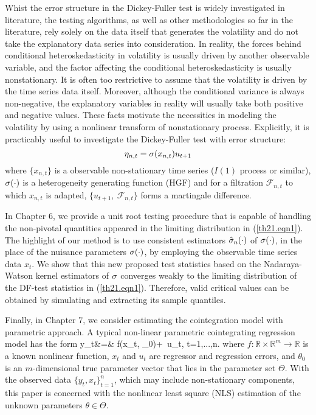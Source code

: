 Whist the error structure  in the Dickey-Fuller test is widely investigated in literature, the testing algorithms, as well as other methodologies so far in the literature,  rely solely on the  data itself that generates the volatility  and do not  take the explanatory data series into consideration. In reality, the forces behind conditional heteroskedasticity in volatility is usually driven by another observable variable, and the factor affecting the conditional heteroskedasticity is usually nonstationary. It is often too restrictive to assume that the volatility  is driven by the time series data itself. Moreover, although the conditional variance is always non-negative, the explanatory variables in reality will usually take both positive and negative values. These facts motivate the necessities in  modeling the volatility by using a nonlinear transform of nonstationary process. Explicitly, it is practicably useful to investigate  the Dickey-Fuller
 test with  error structure:
\begin{equation} \la{eqn11}
\eta_{n,t} = \si (x_{n,t}) u_{t+1}
\end{equation}
where $\{x_{n,t}\}$ is a observable  non-stationary time series ($I(1)$ process or similar), $\sigma(\cdot)$ is  a heterogeneity generating
function (HGF) and for a filtration $\mathcal{F}_{n,t}$ to which $x_{n,t}$
is adapted, $\{u_{t+1},\ {\mathcal{F}_{n,t}}\}$ forms a martingale
difference.

In Chapter 6, we provide a unit root testing procedure that is capable of handling the non-pivotal quantities appeared in the limiting distribution in (\ref{th21.eqn1}). The highlight of our method is to use  consistent estimators $\hat{\sigma}_n(\cdot)$ of $\sigma(\cdot)$,   in the place of the nuisance parameters $\sigma(\cdot)$, by employing the observable time series data $x_{t}$. We show that this new proposed test statistics based on the Nadaraya-Watson kernel estimators of $\sigma$ converges weakly to the limiting distribution of the DF-test statistics in (\ref{th21.eqn1}). Therefore, valid critical values can be obtained by simulating and extracting its sample quantiles.









Finally, in Chapter 7, we consider estimating the cointegration model with parametric approach. A typical non-linear parametric cointegrating
regression model has the form
 \be y_t&=&
f(x_t, \theta_0)+\,  u_t, \quad t=1,...,n.
\ee
where  $f:\mathbb{R} \times \mathbb{R}^m \rightarrow \mathbb{R}$ is a known nonlinear function,
$x_t$ and  $u_t$ are regressor and regression errors, and   $\theta_0$ is an $m$-dimensional true parameter vector that lies in the parameter set $\Theta$. With the observed data $\{y_t, x_t\}_{t=1}^n$, which may include non-stationary components, this paper is concerned with the nonlinear least square (NLS) estimation of the unknown parameters $\theta\in \Theta$.


